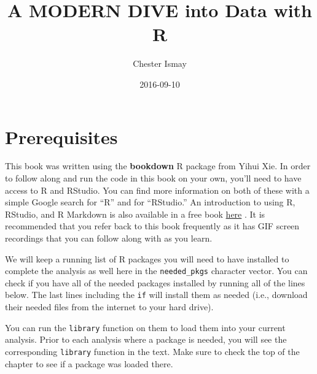 \documentclass[]{tufte-book}
\title{A MODERN DIVE into Data with R}
\author{Chester Ismay}
\date{2016-09-10}
\newenvironment{Shaded}{\begin{snugshade}}{\end{snugshade}}
\newcommand{\KeywordTok}[1]{\textcolor[rgb]{0.13,0.29,0.53}{\textbf{{#1}}}}
\newcommand{\DataTypeTok}[1]{\textcolor[rgb]{0.13,0.29,0.53}{{#1}}}
\newcommand{\StringTok}[1]{\textcolor[rgb]{0.31,0.60,0.02}{{#1}}}
\newcommand{\NormalTok}[1]{{#1}}
\begin{document}
\let\allcaps=\relax
\maketitle



{
\setcounter{tocdepth}{1}
\tableofcontents
}

\chapter{Prerequisites}\label{prereqs}

This book was written using the \textbf{bookdown} R package from Yihui
Xie. In order to follow along and run the code in this book on your own,
you'll need to have access to R and RStudio. You can find more
information on both of these with a simple Google search for ``R'' and
for ``RStudio.'' An introduction to using R, RStudio, and R Markdown is
also available in a free book
\href{http://ismayc.github.io/rbasics-book}{here} \citep{usedtor2016}.
It is recommended that you refer back to this book frequently as it has
GIF screen recordings that you can follow along with as you learn.

We will keep a running list of R packages you will need to have
installed to complete the analysis as well here in the
\texttt{needed\_pkgs} character vector. You can check if you have all of
the needed packages installed by running all of the lines below. The
last lines including the \texttt{if} will install them as needed (i.e.,
download their needed files from the internet to your hard drive).

You can run the \texttt{library} function on them to load them into your
current analysis. Prior to each analysis where a package is needed, you
will see the corresponding \texttt{library} function in the text. Make
sure to check the top of the chapter to see if a package was loaded
there.

\begin{Shaded}
\end{Shaded}
\end{document}

